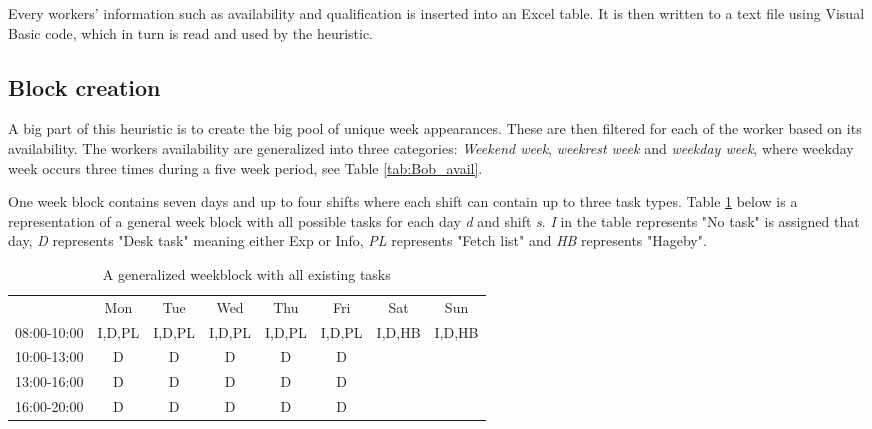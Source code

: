 Every workers' information such as availability and qualification is inserted into an Excel table. It is then written to a text file using Visual Basic code, which in turn is read and used by the heuristic.

\subsection{Block creation} \label{block_creation}
A big part of this heuristic is to create the big pool of unique week appearances. These are then filtered for each of the worker based on its availability. The workers availability are generalized into three categories: \textit{Weekend week}, \textit{weekrest week} and \textit{weekday week}, where weekday week occurs three times during a five week period, see Table \ref{tab:Bob_avail}. 


One week block contains seven days and up to four shifts where each shift can contain up to three task types. Table \ref{Generalized weekblock} below is a representation of a general week block with all possible tasks for each day \textit{d} and shift \textit{s}. \textit{I} in the table represents "No task" is assigned that day, \textit{D} represents "Desk task" meaning either Exp or Info, \textit{PL} represents "Fetch list" and \textit{HB} represents "Hageby". 

\begin{table}[!h]
\centering
\caption{A generalized weekblock with all existing tasks}
\label{Generalized weekblock}
\begin{tabular}{cccccccc}
                         & Mon                         & Tue                         & Wed                         & Thu                         & Fri                         & Sat                         & Sun                         \\ \cline{2-8} 
\multicolumn{1}{c|}{08:00-10:00} & \multicolumn{1}{c|}{I,D,PL} & \multicolumn{1}{c|}{I,D,PL} & \multicolumn{1}{c|}{I,D,PL} & \multicolumn{1}{c|}{I,D,PL} & \multicolumn{1}{c|}{I,D,PL} & \multicolumn{1}{c|}{I,D,HB} & \multicolumn{1}{c|}{I,D,HB} \\ \cline{2-8} 
\multicolumn{1}{c|}{10:00-13:00} & \multicolumn{1}{c|}{D}      & \multicolumn{1}{c|}{D}      & \multicolumn{1}{c|}{D}      & \multicolumn{1}{c|}{D}      & \multicolumn{1}{c|}{D}      &       \\ \cline{2-6} 
\multicolumn{1}{c|}{13:00-16:00} & \multicolumn{1}{c|}{D}      & \multicolumn{1}{c|}{D}      & \multicolumn{1}{c|}{D}      & \multicolumn{1}{c|}{D}      & \multicolumn{1}{c|}{D}      &       \\ \cline{2-6} 
\multicolumn{1}{c|}{16:00-20:00} & \multicolumn{1}{c|}{D}      & \multicolumn{1}{c|}{D}      & \multicolumn{1}{c|}{D}      & \multicolumn{1}{c|}{D}      & \multicolumn{1}{c|}{D}      &       \\ \cline{2-6} 
\end{tabular}
\end{table}

